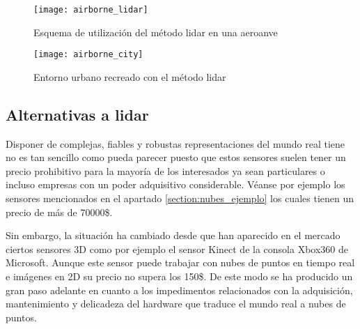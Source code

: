  
\begin{figure}
  \texttt{[image: airborne\_lidar]}
  \caption{Esquema de utilización del método lidar en una aeroanve}\label{fig:airborne_lidar}
\endminipage\hfill
{}
  \texttt{[image: airborne\_city]}
  \caption{Entorno urbano recreado con el método lidar}\label{fig:airborne_city}
\endminipage\hfill

\end{figure}










\subsection{Alternativas a lidar}

Disponer de complejas, fiables y robustas representaciones del mundo real tiene no es tan sencillo como pueda parecer puesto que estos sensores suelen tener un precio prohibitivo para la mayoría de los interesados ya sean particulares o incluso empresas con un poder adquisitivo considerable. Véanse por ejemplo los sensores mencionados en el apartado \ref{section:nubes_ejemplo} los cuales tienen un precio de más de 70000\$.

Sin embargo, la situación ha cambiado desde que han aparecido en el mercado ciertos sensores 3D como por ejemplo el sensor Kinect de la consola Xbox360 de Microsoft\cite{kinect}. Aunque este sensor puede trabajar con nubes de puntos en tiempo real e imágenes en 2D su precio no supera los 150\$. De este modo se ha producido un gran paso adelante en cuanto a los impedimentos relacionados con la adquisición, mantenimiento y delicadeza del hardware que traduce el mundo real a nubes de puntos.



